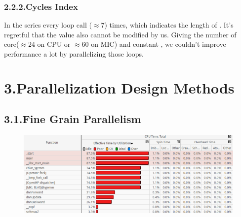\documentclass{article}
\begin{document}
\subsubsection{2.2.2.\hspace*{0.5em}Cycles Index}\label{sec-cycles-index}%

\noindent{}In the  series every loop call  (\ensuremath{\approx}7) times, which indicates the length of . It's regretful that the value also cannot be modified by us. Giving the number of core(\ensuremath{\approx}24 on CPU or \ensuremath{\approx}60 on MIC) and constant , we couldn't improve performance a lot by parallelizing those loops.%

\section{3.\hspace*{0.5em}Parallelization Design Methods}\label{sec-parallelization-design-methods}%

\subsection{3.1.\hspace*{0.5em}Fine Grain Parallelism}\label{sec-fine-grain-parallelism}%

\begin{figure}[tbp]%
\begin{mdcenter}%

\noindent{}\includegraphics[keepaspectratio=true,width=\dimmin{}{\dimwidth{0.90}}]{images/2016-02-19-10-36-48-}{}%

\mdhr{}%

\noindent{}%
\end{mdcenter}\label{fig-figure}%
\end{figure}%
\end{document}
